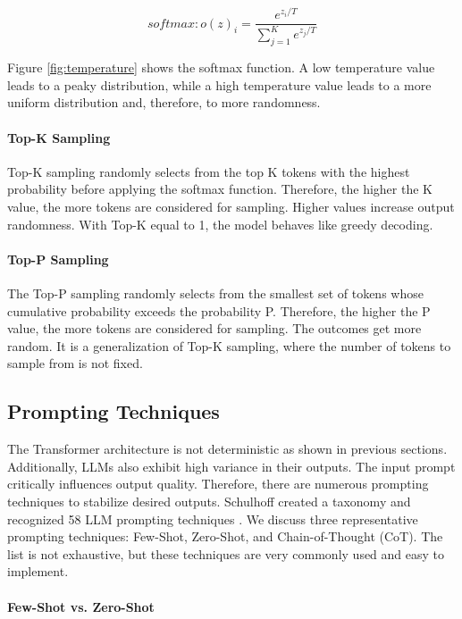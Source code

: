 $$softmax: o(z)_i = \frac{e^{z_i/T}}{\sum_{j=1}^K e^{z_j/T}}$$

Figure \ref{fig:temperature} shows the softmax function. A low temperature value leads to a peaky distribution, while a high temperature value leads to a more uniform distribution and, therefore, to more randomness.


\paragraph{Top-K Sampling}
Top-K sampling \cite{Fan.13.05.2018} randomly selects from the top K tokens with the highest probability before applying the softmax function. Therefore, the higher the K value, the more tokens are considered for sampling. Higher values increase output randomness. With Top-K equal to 1, the model behaves like greedy decoding.

\paragraph{Top-P Sampling}
The Top-P sampling \cite{Holtzman.22.04.2019} randomly selects from the smallest set of tokens whose cumulative probability exceeds the probability P. Therefore, the higher the P value, the more tokens are considered for sampling. The outcomes get more random. It is a generalization of Top-K sampling, where the number of tokens to sample from is not fixed.

\subsection{Prompting Techniques}
The Transformer architecture is not deterministic as shown in previous sections. Additionally, LLMs also exhibit high variance in their outputs. The input prompt critically influences output quality. Therefore, there are numerous prompting techniques to stabilize desired outputs. Schulhoff created a taxonomy and recognized 58 LLM prompting techniques \cite{Schulhoff.06.06.2024}. We discuss three representative prompting techniques: Few-Shot, Zero-Shot, and Chain-of-Thought (CoT). The list is not exhaustive, but these techniques are very commonly used and easy to implement.

\paragraph{Few-Shot vs. Zero-Shot}

